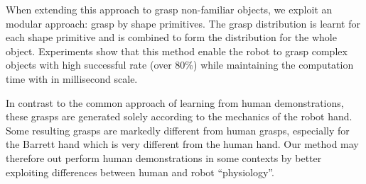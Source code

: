 When extending this approach to grasp non-familiar objects, we exploit an modular approach: grasp by shape primitives. The grasp distribution is learnt for each shape primitive and is combined to form the distribution for the whole object. Experiments show that this method enable the robot to grasp complex objects with high successful rate (over 80\%) while maintaining the computation time with in millisecond scale.

In contrast to the common approach of learning from human demonstrations,
these grasps are generated solely according to the mechanics of the robot hand.
Some resulting grasps are markedly different from  human grasps, especially for the Barrett hand which is very different from the human hand.
Our method may therefore out perform human demonstrations in some
contexts by better exploiting differences between human and robot ``physiology''. 